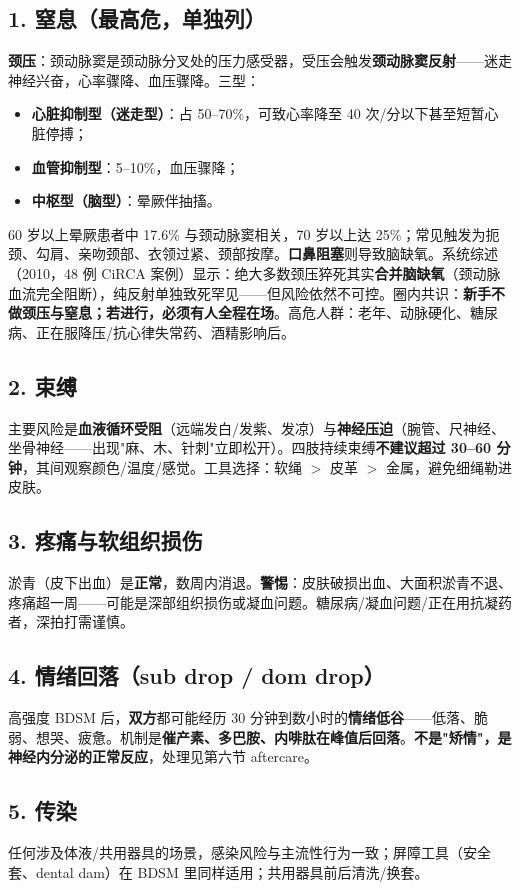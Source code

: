 \documentclass[12pt,UTF8,openany]{ctexbook}
\begin{document}
\subsection*{1. 窒息（最高危，单独列）}
\textbf{颈压}：颈动脉窦是颈动脉分叉处的压力感受器，受压会触发\textbf{颈动脉窦反射}——迷走神经兴奋，心率骤降、血压骤降。三型：
\begin{itemize}
  \item \textbf{心脏抑制型（迷走型）}：占 50--70\%，可致心率降至 40 次/分以下甚至短暂心脏停搏；
  \item \textbf{血管抑制型}：5--10\%，血压骤降；
  \item \textbf{中枢型（脑型）}：晕厥伴抽搐。
\end{itemize}
60 岁以上晕厥患者中 17.6\% 与颈动脉窦相关，70 岁以上达 25\%；常见触发为扼颈、勾肩、亲吻颈部、衣领过紧、颈部按摩。\textbf{口鼻阻塞}则导致脑缺氧。系统综述（2010，48 例 CiRCA 案例）显示：绝大多数颈压猝死其实\textbf{合并脑缺氧}（颈动脉血流完全阻断），纯反射单独致死罕见——但风险依然不可控。圈内共识：\textbf{新手不做颈压与窒息；若进行，必须有人全程在场}。高危人群：老年、动脉硬化、糖尿病、正在服降压/抗心律失常药、酒精影响后。

\subsection*{2. 束缚}
主要风险是\textbf{血液循环受阻}（远端发白/发紫、发凉）与\textbf{神经压迫}（腕管、尺神经、坐骨神经——出现"麻、木、针刺"立即松开）。四肢持续束缚\textbf{不建议超过 30--60 分钟}，其间观察颜色/温度/感觉。工具选择：软绳 $>$ 皮革 $>$ 金属，避免细绳勒进皮肤。

\subsection*{3. 疼痛与软组织损伤}
淤青（皮下出血）是\textbf{正常}，数周内消退。\textbf{警惕}：皮肤破损出血、大面积淤青不退、疼痛超一周——可能是深部组织损伤或凝血问题。糖尿病/凝血问题/正在用抗凝药者，深拍打需谨慎。

\subsection*{4. 情绪回落（sub drop / dom drop）}
高强度 BDSM 后，\textbf{双方}都可能经历 30 分钟到数小时的\textbf{情绪低谷}——低落、脆弱、想哭、疲惫。机制是\textbf{催产素、多巴胺、内啡肽在峰值后回落}。\textbf{不是"矫情"，是神经内分泌的正常反应}，处理见第六节 aftercare。

\subsection*{5. 传染}
任何涉及体液/共用器具的场景，感染风险与主流性行为一致；屏障工具（安全套、dental dam）在 BDSM 里同样适用；共用器具前后清洗/换套。
\end{document}
